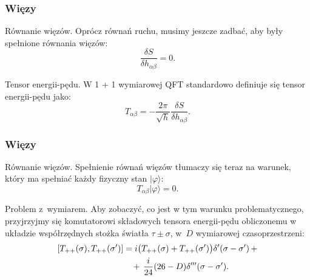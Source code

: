 \documentclass[10pt,t]{beamer}
\begin{document}
\begin{frame}
  \frametitle{Więzy}


  Równanie więzów. Oprócz równań ruchu, musimy jeszcze zadbać, aby były
  spełnione równania więzów:
  \begin{equation}
    \label{eq:O-teorii-strun-08}
    \frac{ \delta S }{ \delta h_{ \alpha \beta } } = 0.
  \end{equation}

  Tensor energii-pędu. W 1 + 1 wymiarowej QFT standardowo definiuje się
  tensor energii-pędu jako:
  \begin{equation}
    \label{eq:O-teorii-strun-08}
    T_{ \alpha \beta } =
    -\frac{ 2 \pi }{ \sqrt{ h } } \frac{ \delta S }{ \delta h_{ \alpha \beta } }.
  \end{equation}

\end{frame}





\begin{frame}
  \frametitle{Więzy}


  Równanie więzów.
  Spełnienie równań więzów tłumaczy się teraz na warunek, który ma
  spełniać każdy fizyczny stan $| \varphi \rangle$:
  \begin{equation}
    \label{eq:O-teorii-strun-09}
    T_{ \alpha \beta } | \varphi \rangle = 0.
  \end{equation}

  Problem z~wymiarem. Aby zobaczyć, co jest w tym warunku problematycznego,
  przyjrzyjmy się komutatorowi składowych tensora energii-pędu
  obliczonemu w układzie współrzędnych stożka światła $\tau \pm \sigma$, w~$D$
  wymiarowej czasoprzestrzeni:
  \begin{equation}
    \label{eq:O-teorii-strun-10}
    \begin{split}
      [ T_{ + + }( \sigma ), T_{ + + }( \sigma' ) ]
      &= i \big( T_{ + + }( \sigma ) + T_{ + + }( \sigma' ) \big) \delta'( \sigma - \sigma' ) \, + \\
      &\hphantom{=} \, + \, \frac{ i }{ 24 } ( 26 - D )
        \delta'''( \sigma - \sigma' ).
    \end{split}
  \end{equation}

\end{frame}
\end{document}
